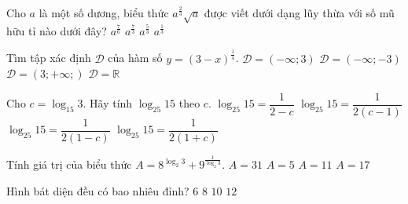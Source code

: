 \begin{ex}%
	Cho $a$ là một số dương, biểu thức $a^{\tfrac{2}{3}}\sqrt{a}$ được viết dưới dạng lũy thừa với số mũ hữu tỉ nào dưới đây?
	\choice
	{\True$a^{\tfrac{7}{6}}$}
	{$a^{\tfrac{7}{3}}$}
	{$a^{\tfrac{5}{3}}$}
	{$a^{\tfrac{1}{3}}$}
\end{ex}

\begin{ex}%
	Tìm tập xác định $\mathscr{D}$ của hàm số $y=(3-x)^{\tfrac{1}{4}}$.
	\choice
	{\True $\mathscr{D}=(-\infty;3)$}
	{$\mathscr{D}=(-\infty;-3)$}
	{$\mathscr{D}=(3;+\infty;)$}
	{$\mathscr{D}=\mathbb{R}$}
\end{ex}

\begin{ex}%
	Cho $c=\log_{15} 3$. Hãy tính $\log_{25} 15$ theo $c$.
	\choice
	{$\log_{25} 15=\dfrac{1}{2-c}$}
	{$\log_{25} 15=\dfrac{1}{2(c-1)}$}
	{\True $\log_{25} 15=\dfrac{1}{2(1-c)}$}
	{$\log_{25} 15=\dfrac{1}{2(1+c)}$}
\end{ex}

\begin{ex}%
	Tính giá trị của biểu thức $A=8^{\log_2 3}+9^{\tfrac{1}{\log_2 3}}$.
	\choice
	{\True $A=31$}
	{$A=5$}
	{$A=11$}
	{$A=17$}
\end{ex}

\begin{ex}%
	Hình bát diện đều có bao nhiêu đỉnh?
	\choice
	{\True $6$}
	{$8$}
	{$10$}
	{$12$}
\end{ex}

